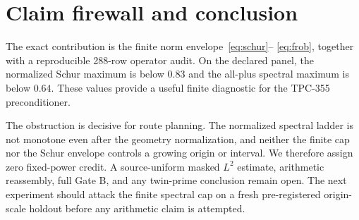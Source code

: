 \documentclass[10pt]{article}
\begin{document}
\section{Claim firewall and conclusion}

The exact contribution is the finite norm envelope~\eqref{eq:schur}--
\eqref{eq:frob}, together with a reproducible 288-row operator audit.  On the
declared panel, the normalized Schur maximum is below $0.83$ and the
all-plus spectral maximum is below $0.64$.  These values provide a useful
finite diagnostic for the TPC-355 preconditioner.

The obstruction is decisive for route planning.  The normalized spectral
ladder is not monotone even after the geometry normalization, and neither the
finite cap nor the Schur envelope controls a growing origin or interval.  We
therefore assign zero fixed-power credit.  A source-uniform masked $L^2$
estimate, arithmetic reassembly, full Gate B, and any twin-prime conclusion
remain open.  The next experiment should attack the finite spectral cap on a
fresh pre-registered origin-scale holdout before any arithmetic claim is
attempted.

\nocite{tpc355}


\end{document}
